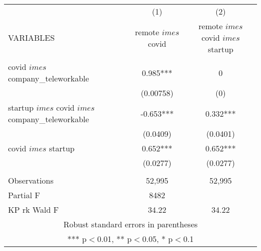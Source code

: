 \begin{tabular}{lcc} \hline
 & (1) & (2) \\
VARIABLES & remote $	imes$ covid & remote $	imes$ covid $	imes$ startup \\ \hline
 &  &  \\
covid $	imes$ company\_teleworkable & 0.985*** & 0 \\
 & (0.00758) & (0) \\
startup $	imes$ covid $	imes$ company\_teleworkable & -0.653*** & 0.332*** \\
 & (0.0409) & (0.0401) \\
covid $	imes$ startup & 0.652*** & 0.652*** \\
 & (0.0277) & (0.0277) \\
 &  &  \\
Observations & 52,995 & 52,995 \\
Partial F & 8482 &  \\
 KP rk Wald F & 34.22 & 34.22 \\ \hline
\multicolumn{3}{c}{ Robust standard errors in parentheses} \\
\multicolumn{3}{c}{ *** p$<$0.01, ** p$<$0.05, * p$<$0.1} \\
\end{tabular}
